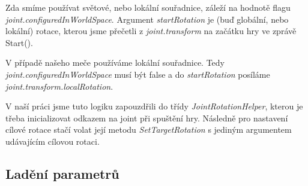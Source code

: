Zda smíme používat světové, nebo lokální souřadnice, záleží na hodnotě flagu \textit{joint.configuredInWorldSpace}. Argument \textit{startRotation} je (buď globální, nebo lokální) rotace, kterou jsme přečetli z \textit{joint.transform} na začátku hry ve zprávě Start().

V případě našeho meče používáme lokální souřadnice. Tedy \textit{joint.configuredInWorldSpace} musí být false a do \textit{startRotation} posíláme \textit{joint.transform.localRotation}.

V naší práci jsme tuto logiku zapouzdřili do třídy \textit{JointRotationHelper}, kterou je třeba inicializovat odkazem na joint při spuštění hry. Následně pro nastavení cílové rotace stačí volat její metodu \textit{SetTargetRotation} s jediným argumentem udávajícím cílovou rotaci.


\subsection{Ladění parametrů} \label{swordParameterTweaksSection}
